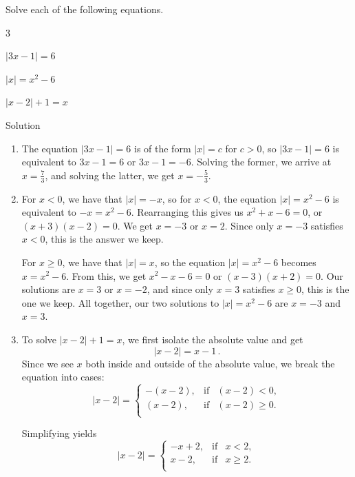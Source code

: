 \ifcalculus
\begin{example}
	Solve each of the following equations.
	
	\begin{enumerate}
	\end{enumerate}
	
	Solution \xhrulefill{gray}{2.5pt}
	
	\begin{enumerate}
		
		\item  The equation  $|3x-1| = 6$ is of the form $|x| = c$ for $c>0$, so $|3x-1| = 6$ is equivalent to $3x-1=6$ or $3x-1 = -6$.  Solving the former, we arrive at $x = \frac{7}{3}$, and solving the latter, we get $x = -\frac{5}{3}$.  
		
		\item 	For $x < 0$, we have that $|x| = -x$, so for $x < 0$, the equation $|x| = x^2-6$ is equivalent to $-x = x^2-6$.  Rearranging this gives us $x^2+x-6 = 0$, or $(x+3)(x-2) = 0$.  We get $x = -3$ or $x=2$.  Since only $x=-3$ satisfies $x<0$, this is the answer we keep.
		
		 For $x \geq 0$, we have that $|x| = x$, so the equation $|x| = x^2-6$ becomes $x = x^2-6$.  From this, we get $x^2-x-6 =0$ or $(x-3)(x+2) = 0$.  Our solutions are $x=3$ or $x = -2$, and since only $x=3$ satisfies $x \geq 0$, this is the one we keep.  All together, our two solutions to $|x| = x^2-6$ are $x=-3$ and $x=3$.
		
		\item  To solve $|x-2| + 1 = x$, we first isolate the absolute value and get 
		\begin{equation}
		|x-2| = x-1\,.
		\label{exabs}
		\end{equation}
		Since we see $x$ both inside and outside of the absolute value, we break the equation into cases:   \[ |x-2| = \left\{ \begin{array}{rcl} -(x-2), & \mbox{if} & (x-2) < 0,  \\ (x-2), & \mbox{if} & (x-2) \geq 0. \\ \end{array} \right.\]
		
		Simplifying yields 
		\[ |x-2| = \left\{ \begin{array}{rcl} -x+2, & \mbox{if} & x < 2, \\ x-2, & \mbox{if} & x \geq 2. \\ \end{array} \right.\]
		

\end{enumerate}
\end{example}
